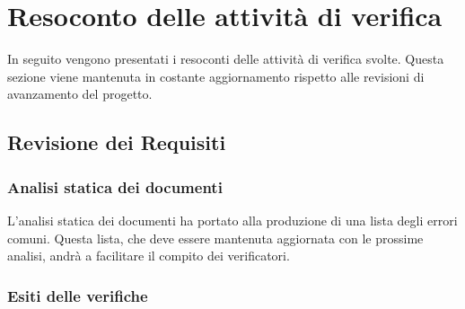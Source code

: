 \section{Resoconto delle attività di verifica}
In seguito vengono presentati i resoconti delle attività di verifica svolte.
Questa sezione viene mantenuta in costante aggiornamento rispetto alle revisioni di avanzamento del progetto.
\subsection{Revisione dei Requisiti}
\subsubsection{Analisi statica dei documenti}
L'analisi statica dei documenti ha portato alla produzione di una lista degli errori comuni. Questa lista, che deve essere mantenuta aggiornata con le prossime analisi, andrà a facilitare il compito dei verificatori.
\subsubsection{Esiti delle verifiche} 
